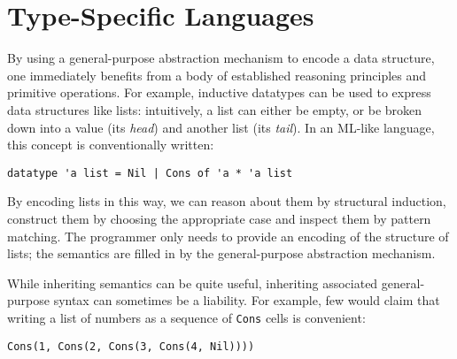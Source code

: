\let\li\lstinline

\section{Type-Specific Languages}\label{aparsing}
By using a general-purpose abstraction mechanism to encode a data structure, one immediately benefits from a body of established reasoning principles and primitive operations. For example, inductive datatypes can be used to express data structures like lists: intuitively, a list can either be empty, or be broken down into a value (its \emph{head}) and another list (its \emph{tail}). In an ML-like language, this concept is conventionally written:
\begin{lstlisting}[numbers=none]
datatype 'a list = Nil | Cons of 'a * 'a list
\end{lstlisting}
By encoding lists in this way, we can reason about them by structural induction, construct them by choosing the appropriate case and inspect them by pattern matching. The programmer only needs to provide an encoding of the structure of lists; the semantics are filled in by the general-purpose abstraction mechanism.

While inheriting semantics can be quite useful, inheriting associated general-purpose syntax can sometimes be a liability. For example, few would claim that writing a list of numbers as a sequence of \li{Cons} cells is convenient:
\begin{lstlisting}[numbers=none]
Cons(1, Cons(2, Cons(3, Cons(4, Nil))))
\end{lstlisting}

